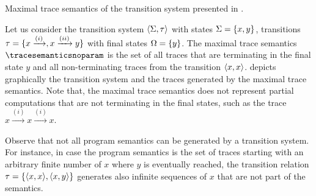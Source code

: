 \begin{marginfigure}
  \centering
{}
\caption{Maximal trace semantics of the transition system presented in .}
\end{marginfigure}

\begin{example}
  Let us consider the transition system $\langle \Sigma, \tau \rangle$ with states $\Sigma = \{x, y\}$, transitions $\tau = \{x \xrightarrow{(i)}, x \xrightarrow{(ii)} y\}$ with final states $\Omega = \{y\}$. The maximal trace semantics $\tracesemanticsnoparam$ is the set of all traces that are terminating in the final state $y$ and all non-terminating traces from the transition $\langle x, x \rangle$.
   depicts graphically the transition system and the traces generated by the maximal trace semantics.
  Note that, the maximal trace semantics does not represent partial computations that are not terminating in the final states, such as the trace $x \xrightarrow{(i)} x \xrightarrow{(i)} x$.
\end{example}

\begin{remark}
  Observe that not all program semantics can be generated by a transition system.
  For instance, in case the program semantics is the set of traces starting with an arbitrary finite number of $x$ where $y$ is eventually reached, the transition relation $\tau = \{\langle x, x \rangle, \langle x, y \rangle\}$ generates also infinite sequences of $x$ that are not part of the semantics.
\end{remark}

